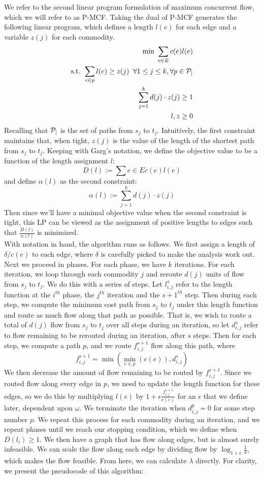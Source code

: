 We refer to the second linear program formulation of maximum
concurrent flow, which we will refer to as P-MCF. Taking the dual of
P-MCF generates the following linear program, which defines a length
$l(e)$ for each edge and a variable $z(j)$ for each commodity.
\begin{align*}
\text{min     } \sum_{e\in E}c(e)l(e) \\
\text{s.t. }\sum_{e\in p}l(e) \geq z(j) \;\;\forall 1\leq j \leq k,
\forall p \in \cal{P}_j\\
\sum_{j=1}^kd(j)\cdot z(j)\geq 1\\
l,z\geq 0
\end{align*}
Recalling that $\cal{P}_j$ is the set of paths from $s_j$ to
$t_j$. Intuitively, the first constraint maintains that, when tight, $z(j)$ is the
value of the length of the shortest path from $s_j$ to $t_j$. Keeping
with Garg's notation, we define the objective value to be a function
of the length assignment $l$:
$$D(l) := \sum{e\in E} c(e)l(e)$$
and define $\alpha(l)$ as the second constraint:
$$\alpha(l) := \sum_{j=1}^k d(j)\cdot z(j)$$
Then since we'll have a minimal objective value when the second
constraint is tight, this LP can be viewed as the assignment of
positive lengths to edges such that $\frac{D(l)}{\alpha(l)}$ is
minimized. \\
With notation in hand, the algorithm runs as follows. We first assign
a length of $\delta/c(e)$ to each edge, where $\delta$ is carefully picked
to make the analysis work out. Next we proceed in phases. For each
phase, we have $k$ iterations. For each iteration, we loop through
each commodity $j$ and reroute $d(j)$ units of flow from $s_j$ to
$t_j$. We do this with a series of steps. Let $l_{i,j}^s$ refer to the
length function at the $i^{th}$ phase, the $j^{th}$ iteration and the
$s+1^{th}$ step. Then during each step, we compute the minimum cost
path from $s_j$ to $t_j$ under this length function and route as much
flow along that path as possible. That is, we wish to route a total of
$d(j)$ flow from $s_j$ to $t_j$ over all steps during an iteration, so
let $d_{i,j}^s$ refer to flow remaining to be rerouted during an
iteration, after $s$ steps. Then for each step, we compute a path $p$,
and we route $f_{i,j}^{s+1}$ flow along this path, where
$$f_{i,j}^{s+1}=\min(\min_{e\in p}(c(e)),d_{i,j}^s)$$
We then decrease the amount of flow remaining to be routed by
$f_{i,j}^{s+1}$. Since we routed flow along every edge in $p$, we
need to update the length function for these edges, so we do this by
multiplying $l(e)$ by $1+\epsilon \frac{f_{i,j}^{s+1}}{c(e)}$ for an
$\epsilon$ that we define later, dependent upon $\omega$. We terminate
the iteration when $d_{i,j}^p=0$ for some step number $p$. We repeat
this process for each commodity during an iteration, and we repeat
phases until we reach our stopping condition, which we define when
$D(l_{i})\geq 1$. We then have a graph that has flow along edges, but
is almost surely infeasible. We can scale the flow along each edge by
dividing flow by $\log_{1+\epsilon}\frac{1}{\delta}$, which makes the
flow feasible. From here, we can calculate $\lambda$ directly. 
For clarity, we present the pseudocode of this
algorithm:


